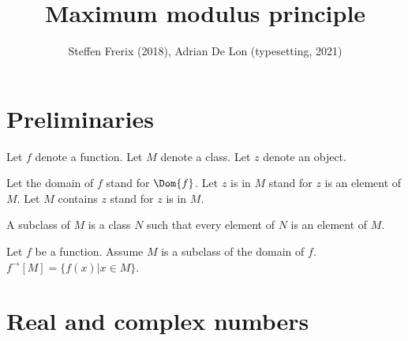\documentclass{article}
\title{Maximum modulus principle}
\author{Steffen Frerix (2018), Adrian De Lon (typesetting, 2021)}
\date{}
\newcommand{\image}[2]{#1^{\to}[#2]}
\begin{document}

  \maketitle


  \section{Preliminaries}

  \begin{forthel}

    Let $f$ denote a function.
    Let $M$ denote a class.
    Let $z$ denote an object.

    Let the domain of $f$ stand for $\Dom{f}$.
    Let $z$ is in $M$ stand for $z$ is an element of $M$.
    Let $M$ contains $z$ stand for $z$ is in $M$.

    \begin{definition}
      A subclass of $M$ is a class $N$ such that
      every element of $N$ is an element of $M$.
    \end{definition}

    \begin{definition}
      Let $f$ be a function.
      Assume $M$ is a subclass of the domain of $f$.
      $\image{f}{M} = \{ f(x) | x\in M \}$.
    \end{definition}
  \end{forthel}

    \section{Real and complex numbers}
\end{document}
